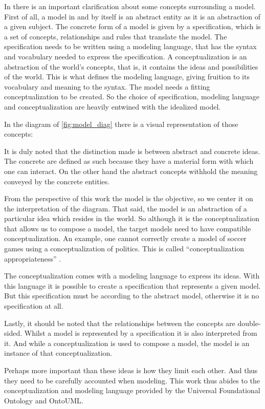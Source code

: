 In \cite{guizzardi_ontological_2005} there is an important clarification about some concepts surrounding a model. First of all, a model in and by itself is an abstract entity as it is an abstraction of a given subject. The concrete form of a model is given by a specification, which is a set of concepts, relationships and rules that translate the model. The specification needs to be written using a modeling language, that has the syntax and vocabulary needed to express the specification. A conceptualization is an abstraction of the world's concepts, that is, it contains the ideas and possibilities of the world. This is what defines the modeling language, giving fruition to its vocabulary and meaning to the syntax. The model needs a fitting conceptualization to be created. So the choice of specification, modeling language and conceptualization are heavily entwined with the idealized model.

In the diagram of \autoref{fig:model_diag} there is a visual representation of those concepts:



It is duly noted that the distinction made is between abstract and concrete ideas. The concrete are defined as such because they have a material form with which one can interact. On the other hand the abstract concepts withhold the meaning conveyed by the concrete entities.

From the perspective of this work the model is the objective, so we center it on the interpretation of the diagram. That said, the model is an abstraction of a particular idea which resides in the world. So although it is the conceptualization that allows us to compose a model, the target models need to have compatible conceptualization. An example, one cannot correctly create a model of soccer games using a conceptualization of politics. This is called ``conceptualization appropriateness'' \cite{guizzardi_ontological_2005}.

The conceptualization comes with a modeling language to express its ideas. With this language it is possible to create a specification that represents a given model. But this specification must be according to the abstract model, otherwise it is no specification at all. 

Lastly, it should be noted that the relationships between the concepts are double-sided. Whilst a model is represented by a specification it is also interpreted from it. And while a conceptualization is used to compose a model, the model is an instance of that conceptualization.

Perhaps more important than these ideas is how they limit each other. And thus they need to be carefully accounted when modeling. This work thus abides to the conceptualization and modeling language provided by the Universal Foundational Ontology and OntoUML.